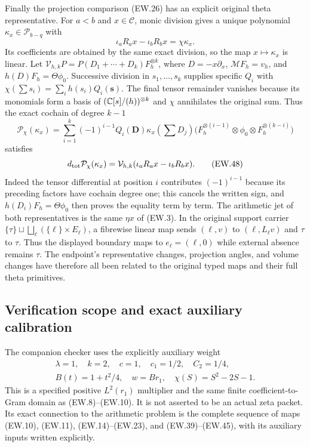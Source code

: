 Finally the projection comparison (EW.26) has an explicit original
theta representative. For $a<b$ and $x\in\mathcal C$, monic
division gives a unique polynomial $\kappa_x\in\mathcal P_{b-q}$
with
\[
 \iota_aR_ax-\iota_bR_bx=\chi\kappa_x.                       \tag{EW.46}
\]
Its coefficients are obtained by the same exact division, so the
map $x\mapsto\kappa_x$ is linear. Let
$\mathcal V_{h,k}P=P(D_1+\cdots+D_k)F_h^{\otimes k}$, where
$D=-x\partial_x$, $\mathcal MF_h=v_h$, and
$h(D)F_h=\Theta\phi_0$. Successive division in
$s_1,\ldots,s_k$ supplies specific $Q_i$ with
$\chi(\sum s_i)=\sum_i h(s_i)Q_i(\mathbf s)$.
The final tensor remainder vanishes because its monomials form a
basis of $(\mathbb C[s]/(h))^{\otimes k}$ and $\chi$ annihilates
the original sum. Thus the exact cochain of degree $k-1$
\[
 \mathcal P_\chi(\kappa_x)=
 \sum_{i=1}^k(-1)^{i-1}Q_i(\mathbf D)\kappa_x(\textstyle\sum D_j)
 \bigl(F_h^{\otimes(i-1)}\otimes\phi_0\otimes
                         F_h^{\otimes(k-i)}\bigr)            \tag{EW.47}
\]
satisfies
\[
 d_{\rm tot}\mathcal P_\chi(\kappa_x)
   =\mathcal V_{h,k}(\iota_aR_ax-\iota_bR_bx).                \tag{EW.48}
\]
Indeed the tensor differential at position $i$ contributes
$(-1)^{i-1}$ because its preceding factors have cochain degree
one; this cancels the written sign, and $h(D_i)F_h=\Theta\phi_0$
then proves the equality term by term. The arithmetic jet of both
representatives is the same $\eta x$ of (EW.3). In the original
support carrier $\{\tau\}\sqcup\bigsqcup_\ell(\{\ell\}\times E_\ell)$,
a fibrewise linear map sends $(\ell,v)$ to $(\ell,L_\ell v)$
and $\tau$ to $\tau$. Thus the displayed boundary maps to
$e_\ell=(\ell,0)$ while external absence remains $\tau$.
The endpoint's representative changes, projection angles, and volume
changes have therefore all been related to the original typed maps
and their full theta primitives.

\subsection{Verification scope and exact auxiliary calibration}

The companion checker uses the explicitly auxiliary weight
\[
 \begin{gathered}
 \lambda=1,\quad k=2,\quad c=1,\quad c_1=1/2,\quad C_2=1/4,\\
 B(t)=1+t^2/4,\quad w=B r_1,\quad\chi(S)=S^2-2S-1.
 \end{gathered}                                               \tag{EW.49}
\]
This is a specified positive $L^2(r_1)$ multiplier and the same
finite coefficient-to-Gram domain as (EW.8)--(EW.10). It is not
asserted to be an actual zeta packet. Its exact connection to the
arithmetic problem is the complete sequence of maps (EW.10),
(EW.11), (EW.14)--(EW.23), and (EW.39)--(EW.45), with its
auxiliary inputs written explicitly.


